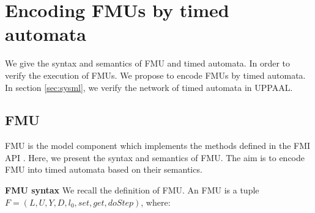 \section{Encoding FMUs by timed automata}
\label{sec:fmi}
We give the syntax and semantics of FMU and timed automata. In order to verify the  execution of FMUs. We propose to encode FMUs by timed automata. In section \ref{sec:sysml}, we verify the network of timed automata in UPPAAL.
\subsection{FMU}
FMU is the model component which implements the methods defined in the FMI API \cite{Tripakis15}. Here, we present the syntax and semantics of FMU. The aim is to encode FMU into timed automata based on their semantics. 
\begin{definition}
\textbf{FMU syntax}
We recall the definition of FMU. An FMU is a tuple $F=(L,U,Y,D,l_{0},set,get,doStep)$, where:
\end{definition}
